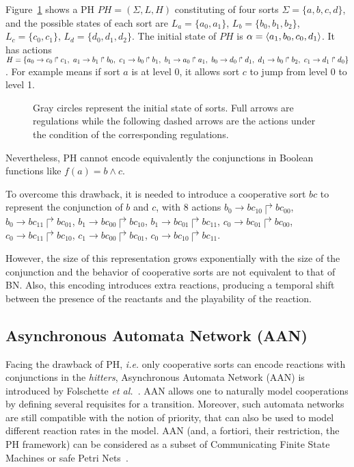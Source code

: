 \begin{example}
Figure~\ref{fig:PH} shows a PH $PH=(\Sigma, L, H)$ constituting of four sorts $\Sigma=\{a,b,c,d\}$, and the possible states of each sort are $L_a=\{a_0,a_1\}$, $L_b=\{b_0,b_1,b_2\}$, $L_c=\{c_0,c_1\}$, $L_d=\{d_0,d_1,d_2\}$.
The initial state of $PH$ is $\alpha=\langle a_1,b_0,c_0,d_1\rangle$. 
It has actions $H=\{\acmph{a_0}{c_0}{c_1},\ \acmph{a_1}{b_1}{b_0},\ \acmph{c_1}{b_0}{b_1},\ \acmph{b_1}{a_0}{a_1},\ \acmph{b_0}{d_0}{d_1},\ \acmph{d_1}{b_0}{b_2},\ \acmph{c_1}{d_1}{d_0}\}$. 
For example  means if sort $a$ is at level 0, it allows sort $c$ to jump from level 0 to level 1.

\end{example}

\begin{figure}[ht]
\centering

\caption[Process Hitting]{Gray circles represent the initial state of sorts.
Full arrows are regulations while the following dashed arrows are the actions under the condition of the corresponding regulations.}\label{fig:PH}
\end{figure}

Nevertheless, PH cannot encode equivalently the conjunctions in Boolean functions like $f(a)=b\land c$.

To overcome this drawback, it is needed to introduce a cooperative sort $bc$ to represent the conjunction of $b$ and $c$, with 8 actions $b_0\to bc_{10}\Rsh bc_{00}$, $b_0\to bc_{11}\Rsh bc_{01}$, $b_1\to bc_{00}\Rsh bc_{10}$, $b_1\to bc_{01}\Rsh bc_{11}$, $c_0\to bc_{01}\Rsh bc_{00}$, $c_0\to bc_{11}\Rsh bc_{10}$, $c_1\to bc_{00}\Rsh bc_{01}$, $c_0\to bc_{10}\Rsh bc_{11}$.

However, the size of this representation grows exponentially with the size of the conjunction and the behavior of cooperative sorts are not equivalent to that of BN. 
Also, this encoding introduces extra reactions, producing a temporal shift between the presence of the reactants and the playability of the reaction.

\subsection{Asynchronous Automata Network (AAN)}\label{sec:AAN}
Facing the drawback of PH, \textit{i.e.} only cooperative sorts can encode reactions with conjunctions in the \textit{hitters}, Asynchronous Automata Network (AAN) is introduced by Folschette \textit{et al.}~\cite{folschette2015}.
AAN allows one to naturally model cooperations by defining several requisites for a transition.
Moreover, such automata networks are still compatible with the notion of priority, that can also be used to model different reaction rates in the model.
AAN (and, a fortiori, their restriction, the PH framework) can be considered as a subset of Communicating Finite State Machines or safe Petri Nets~\cite{pauleve2012process}.

